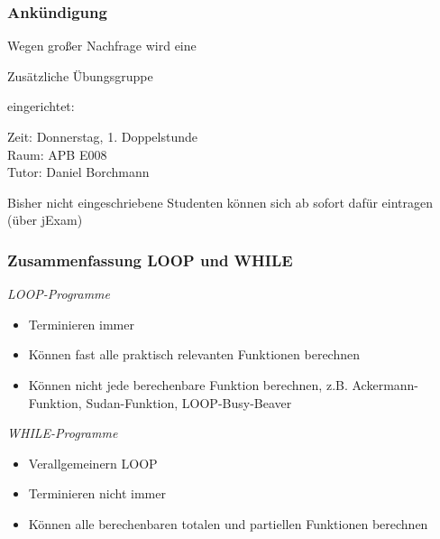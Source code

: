 \documentclass[onlymath]{beamer}
\begin{document}
\maketitle

\begin{frame}\frametitle{Ankündigung}

Wegen großer Nachfrage wird eine

\begin{center}
{\huge Zusätzliche Übungsgruppe}
\end{center}

eingerichtet:\bigskip

\alert{Zeit:} Donnerstag, 1. Doppelstunde\\
\alert{Raum:} APB E008\\
\alert{Tutor:} Daniel Borchmann
\bigskip

Bisher nicht eingeschriebene Studenten können sich ab sofort dafür eintragen (über jExam)

\end{frame}

% 
% 


\begin{frame}\frametitle{Zusammenfassung LOOP und WHILE}

\emph{LOOP-Programme}
\begin{itemize}
\item Terminieren immer
\item Können fast alle praktisch relevanten Funktionen berechnen
\item Können nicht jede berechenbare Funktion berechnen, z.B. Ackermann-Funktion, Sudan-Funktion, LOOP-Busy-Beaver
\end{itemize}
\bigskip

\emph{WHILE-Programme}
\begin{itemize}
\item Verallgemeinern LOOP
\item Terminieren nicht immer
\item Können alle berechenbaren totalen und partiellen Funktionen berechnen
\end{itemize}

\end{frame}
\end{document}
